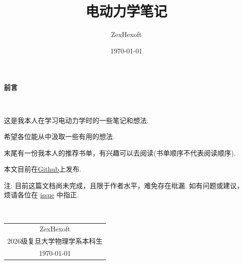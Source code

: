 \documentclass[12pt, a4paper, oneside]{ctexbook}
\title{{\Huge{\textbf{电动力学笔记}}}}
\author{ZexHexoft}
\date{\today}
\begin{document}
\maketitle

\setcounter{page}{1}

\begin{center}
    \Huge\textbf{前言}
\end{center}~\

这是我本人在学习电动力学时的一些笔记和想法.

希望各位能从中汲取一些有用的想法.

末尾有一份我本人的推荐书单，有兴趣可以去阅读(书单顺序不代表阅读顺序).

本文目前在\href{https://github.com/ZexHexoft/ElectroDynamicsNotes}{Github}上发布.

注: 目前这篇文档尚未完成，且限于作者水平，难免存在纰漏. 如有问题或建议，烦请各位在 \href{https://github.com/ZexHexoft/ElectroDynamicsNotes/issues}{issue} 中指正.

~\\
\begin{flushright}
    \begin{tabular}{c}
        ZexHexoft\\
        2026级复旦大学物理学系本科生\\
        \today
    \end{tabular}
\end{flushright}


\newpage
{}
\setcounter{page}{1}
\tableofcontents
\newpage

\setcounter{chapter}{-1}
\setcounter{page}{1}








\begin{refsection}
  \nocite{*}
  \printbibliography[title=推荐书单]
\end{refsection}
\end{document}
